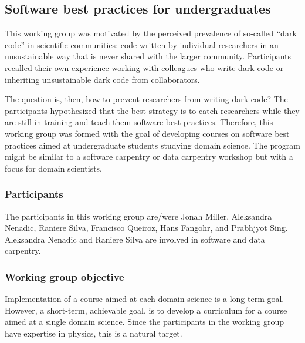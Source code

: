 \subsection{Software best practices for undergraduates}
\label{sec:best-practices-undergrads}



This working group was motivated by the perceived prevalence of
so-called ``dark code'' in scientific communities: code written by
individual researchers in an unsustainable way that is never shared
with the larger community. Participants recalled their own experience
working with colleagues who write dark code or inheriting
unsustainable dark code from collaborators.

The question is, then, how to prevent researchers from writing dark
code? The participants hypothesized that the best strategy is to catch
researchers while they are still in training and teach them software
best-practices. Therefore, this working group was formed with the goal
of developing courses on software best practices aimed at
undergraduate students studying domain science. The program might be
similar to a software carpentry or data carpentry workshop but with a
focus for domain scientists.

\subsubsection{Participants}

The participants in this working group are/were Jonah Miller,
Aleksandra Nenadic, Raniere Silva, Francisco Queiroz, Hans Fangohr,
and Prabhjyot Sing. Aleksandra Nenadic and Raniere Silva are involved
in software and data carpentry.

\subsubsection{Working group objective}

Implementation of a course aimed at each domain science is a long term
goal. However, a short-term, achievable goal, is to develop a
curriculum for a course aimed at a single domain science. Since the
participants in the working group have expertise in physics, this is a
natural target.

